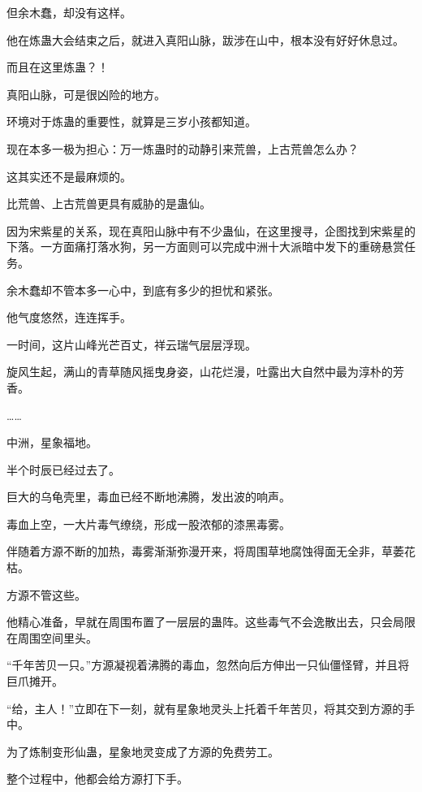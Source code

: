 \begin{this_body}
但余木蠢，却没有这样。

他在炼蛊大会结束之后，就进入真阳山脉，跋涉在山中，根本没有好好休息过。

而且在这里炼蛊？！

真阳山脉，可是很凶险的地方。

环境对于炼蛊的重要性，就算是三岁小孩都知道。

现在本多一极为担心：万一炼蛊时的动静引来荒兽，上古荒兽怎么办？

这其实还不是最麻烦的。

比荒兽、上古荒兽更具有威胁的是蛊仙。

因为宋紫星的关系，现在真阳山脉中有不少蛊仙，在这里搜寻，企图找到宋紫星的下落。一方面痛打落水狗，另一方面则可以完成中洲十大派暗中发下的重磅悬赏任务。

余木蠢却不管本多一心中，到底有多少的担忧和紧张。

他气度悠然，连连挥手。

一时间，这片山峰光芒百丈，祥云瑞气层层浮现。

旋风生起，满山的青草随风摇曳身姿，山花烂漫，吐露出大自然中最为淳朴的芳香。

……

中洲，星象福地。

半个时辰已经过去了。

巨大的乌龟壳里，毒血已经不断地沸腾，发出波的响声。

毒血上空，一大片毒气缭绕，形成一股浓郁的漆黑毒雾。

伴随着方源不断的加热，毒雾渐渐弥漫开来，将周围草地腐蚀得面无全非，草萎花枯。

方源不管这些。

他精心准备，早就在周围布置了一层层的蛊阵。这些毒气不会逸散出去，只会局限在周围空间里头。

“千年苦贝一只。”方源凝视着沸腾的毒血，忽然向后方伸出一只仙僵怪臂，并且将巨爪摊开。

“给，主人！”立即在下一刻，就有星象地灵头上托着千年苦贝，将其交到方源的手中。

为了炼制变形仙蛊，星象地灵变成了方源的免费劳工。

整个过程中，他都会给方源打下手。

\end{this_body}

